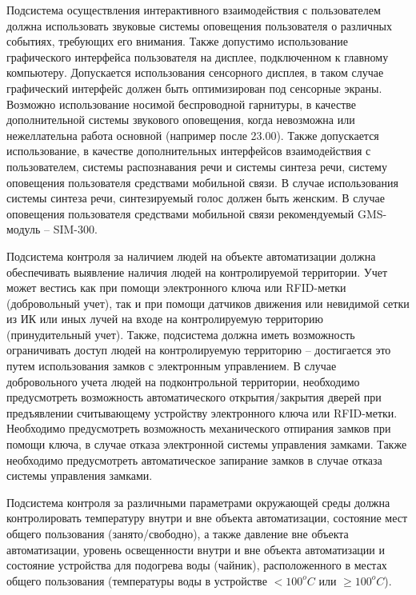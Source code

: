 \documentclass[a4paper, 12pt, titlepage]{article}
\begin{document}
Подсистема осуществления интерактивного взаимодействия с пользователем должна использовать звуковые системы оповещения 
пользователя о различных событиях, требующих его внимания. Также допустимо использование графического интерфейса пользователя 
на дисплее, подключенном к главному компьютеру. Допускается использования сенсорного дисплея, в таком случае графический 
интерфейс должен быть оптимизирован под сенсорные экраны. Возможно использование носимой беспроводной гарнитуры, в качестве 
дополнительной системы звукового оповещения, когда невозможна или нежеллательна работа основной (например после 23.00). Также 
допускается использование, в качестве дополнительных интерфейсов взаимодействия с пользователем, системы распознавания речи и 
системы синтеза речи, систему оповещения пользователя средствами мобильной связи. В случае использования системы синтеза 
речи, синтезируемый голос должен быть женским. В случае оповещения пользователя средствами мобильной связи рекомендуемый 
GMS-модуль -- SIM-300.

Подсистема контроля за наличием людей на объекте автоматизации должна обеспечивать выявление наличия людей на контролируемой 
территории. Учет может вестись как при помощи электронного ключа или RFID-метки (добровольный учет), так и при помощи 
датчиков движения или невидимой сетки из ИК или иных лучей на входе на контролируемую территорию (принудительный учет). Также, 
подсистема должна иметь возможность ограничивать доступ людей на контролируемую территорию -- достигается это путем использования 
замков с электронным управлением. В случае добровольного учета людей на подконтрольной территории, необходимо предусмотреть возможность 
автоматического открытия/закрытия дверей при предъявлении считывающему устройству электронного ключа или RFID-метки. Необходимо 
предусмотреть возможность механического отпирания замков при помощи ключа, в случае отказа электронной системы управления замками. 
Также необходимо предусмотреть автоматическое запирание замков в случае отказа системы управления замками.

Подсистема контроля за различными параметрами окружающей среды должна контролировать температуру внутри и вне объекта автоматизации, 
состояние мест общего пользования (занято/свободно), а также давление вне объекта автоматизации, уровень освещенности внутри и вне 
объекта автоматизации и состояние устройства для подогрева воды (чайник), расположенного в местах общего пользования (температуры воды 
в устройстве $< 100^o C \text{ или } \ge 100^o C$).
\end{document}
